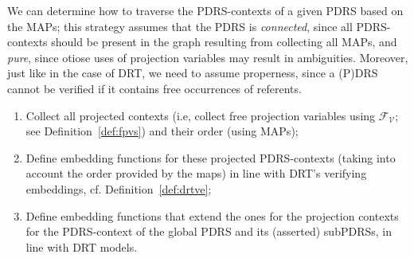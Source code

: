 
We can determine how to traverse the PDRS-contexts
of a given PDRS based on the MAPs; this strategy assumes that the PDRS is
\textit{connected}, since all PDRS-contexts should be present in the graph
resulting from collecting all MAPs, and \textit{pure}, since otiose uses of
projection variables may result in ambiguities. Moreover, just like in the
case of DRT, we need to assume properness, since a (P)DRS cannot be verified
if it contains free occurrences of referents.


\begin{enumerate}
  \item Collect all projected contexts (i.e, collect free projection
    variables using $\mathcal{F_V}$; see Definition~\ref{def:fpvs}) and
    their order (using MAPs);
  \item Define embedding functions for these projected PDRS-contexts 
    (taking into account the order provided by the maps) in line with
    DRT's verifying embeddings, cf. Definition~\ref{def:drtve};
  \item Define embedding functions that extend the ones for the projection
    contexts for the PDRS-context of the global PDRS and its (asserted)
    subPDRSs, in line with DRT models.
\end{enumerate}





